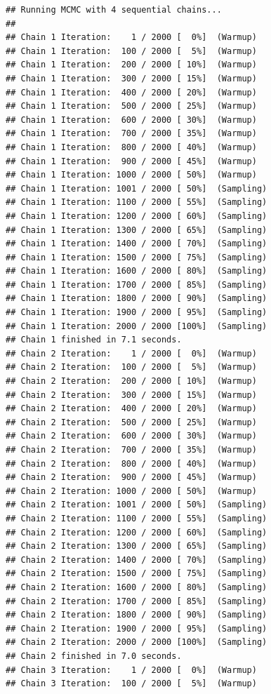 \documentclass[
]{article}
\begin{document}
\begin{verbatim}
## Running MCMC with 4 sequential chains...
## 
## Chain 1 Iteration:    1 / 2000 [  0%]  (Warmup) 
## Chain 1 Iteration:  100 / 2000 [  5%]  (Warmup) 
## Chain 1 Iteration:  200 / 2000 [ 10%]  (Warmup) 
## Chain 1 Iteration:  300 / 2000 [ 15%]  (Warmup) 
## Chain 1 Iteration:  400 / 2000 [ 20%]  (Warmup) 
## Chain 1 Iteration:  500 / 2000 [ 25%]  (Warmup) 
## Chain 1 Iteration:  600 / 2000 [ 30%]  (Warmup) 
## Chain 1 Iteration:  700 / 2000 [ 35%]  (Warmup) 
## Chain 1 Iteration:  800 / 2000 [ 40%]  (Warmup) 
## Chain 1 Iteration:  900 / 2000 [ 45%]  (Warmup) 
## Chain 1 Iteration: 1000 / 2000 [ 50%]  (Warmup) 
## Chain 1 Iteration: 1001 / 2000 [ 50%]  (Sampling) 
## Chain 1 Iteration: 1100 / 2000 [ 55%]  (Sampling) 
## Chain 1 Iteration: 1200 / 2000 [ 60%]  (Sampling) 
## Chain 1 Iteration: 1300 / 2000 [ 65%]  (Sampling) 
## Chain 1 Iteration: 1400 / 2000 [ 70%]  (Sampling) 
## Chain 1 Iteration: 1500 / 2000 [ 75%]  (Sampling) 
## Chain 1 Iteration: 1600 / 2000 [ 80%]  (Sampling) 
## Chain 1 Iteration: 1700 / 2000 [ 85%]  (Sampling) 
## Chain 1 Iteration: 1800 / 2000 [ 90%]  (Sampling) 
## Chain 1 Iteration: 1900 / 2000 [ 95%]  (Sampling) 
## Chain 1 Iteration: 2000 / 2000 [100%]  (Sampling) 
## Chain 1 finished in 7.1 seconds.
## Chain 2 Iteration:    1 / 2000 [  0%]  (Warmup) 
## Chain 2 Iteration:  100 / 2000 [  5%]  (Warmup) 
## Chain 2 Iteration:  200 / 2000 [ 10%]  (Warmup) 
## Chain 2 Iteration:  300 / 2000 [ 15%]  (Warmup) 
## Chain 2 Iteration:  400 / 2000 [ 20%]  (Warmup) 
## Chain 2 Iteration:  500 / 2000 [ 25%]  (Warmup) 
## Chain 2 Iteration:  600 / 2000 [ 30%]  (Warmup) 
## Chain 2 Iteration:  700 / 2000 [ 35%]  (Warmup) 
## Chain 2 Iteration:  800 / 2000 [ 40%]  (Warmup) 
## Chain 2 Iteration:  900 / 2000 [ 45%]  (Warmup) 
## Chain 2 Iteration: 1000 / 2000 [ 50%]  (Warmup) 
## Chain 2 Iteration: 1001 / 2000 [ 50%]  (Sampling) 
## Chain 2 Iteration: 1100 / 2000 [ 55%]  (Sampling) 
## Chain 2 Iteration: 1200 / 2000 [ 60%]  (Sampling) 
## Chain 2 Iteration: 1300 / 2000 [ 65%]  (Sampling) 
## Chain 2 Iteration: 1400 / 2000 [ 70%]  (Sampling) 
## Chain 2 Iteration: 1500 / 2000 [ 75%]  (Sampling) 
## Chain 2 Iteration: 1600 / 2000 [ 80%]  (Sampling) 
## Chain 2 Iteration: 1700 / 2000 [ 85%]  (Sampling) 
## Chain 2 Iteration: 1800 / 2000 [ 90%]  (Sampling) 
## Chain 2 Iteration: 1900 / 2000 [ 95%]  (Sampling) 
## Chain 2 Iteration: 2000 / 2000 [100%]  (Sampling) 
## Chain 2 finished in 7.0 seconds.
## Chain 3 Iteration:    1 / 2000 [  0%]  (Warmup) 
## Chain 3 Iteration:  100 / 2000 [  5%]  (Warmup) 

\end{verbatim}
\end{document}
